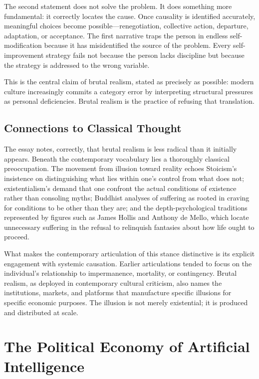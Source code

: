 \documentclass[12pt, a4paper]{article}
\theoremstyle{plain}
\theoremstyle{definition}
\theoremstyle{remark}
\begin{document}
The second statement does not solve the problem.
It does something more fundamental: it correctly locates the cause.
Once causality is identified accurately, meaningful choices become possible---renegotiation,
collective action, departure, adaptation, or acceptance.
The first narrative traps the person in endless self-modification because it has
misidentified the source of the problem.
Every self-improvement strategy fails not because the person lacks discipline
but because the strategy is addressed to the wrong variable.

This is the central claim of brutal realism, stated as precisely as possible:
modern culture increasingly commits a category error by interpreting structural
pressures as personal deficiencies.
Brutal realism is the practice of refusing that translation.

\subsection{Connections to Classical Thought}

The essay notes, correctly, that brutal realism is less radical than it initially appears.
Beneath the contemporary vocabulary lies a thoroughly classical preoccupation.
The movement from illusion toward reality echoes Stoicism's insistence on distinguishing
what lies within one's control from what does not;
existentialism's demand that one confront the actual conditions of existence rather
than consoling myths;
Buddhist analyses of suffering as rooted in craving for conditions to be other than they are;
and the depth-psychological traditions represented by figures such as James Hollis
and Anthony de Mello, which locate unnecessary suffering in the refusal to relinquish
fantasies about how life ought to proceed.

What makes the contemporary articulation of this stance distinctive is its explicit
engagement with systemic causation.
Earlier articulations tended to focus on the individual's relationship to
impermanence, mortality, or contingency.
Brutal realism, as deployed in contemporary cultural criticism, also names the
institutions, markets, and platforms that manufacture specific illusions for
specific economic purposes.
The illusion is not merely existential; it is produced and distributed at scale.

\section{The Political Economy of Artificial Intelligence}
\end{document}
